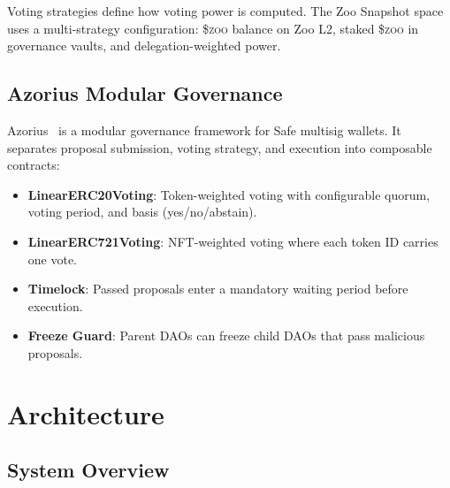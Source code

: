 \documentclass[11pt,letterpaper]{article}
\newcommand{\ZOO}{\$\textsc{zoo}}
\begin{document}
Voting strategies define how voting power is computed. The Zoo Snapshot space uses a multi-strategy configuration: \ZOO{} balance on Zoo L2, staked \ZOO{} in governance vaults, and delegation-weighted power.

\subsection{Azorius Modular Governance}

Azorius~\cite{fractal2023} is a modular governance framework for Safe multisig wallets. It separates proposal submission, voting strategy, and execution into composable contracts:

\begin{itemize}
    \item \textbf{LinearERC20Voting}: Token-weighted voting with configurable quorum, voting period, and basis (yes/no/abstain).
    \item \textbf{LinearERC721Voting}: NFT-weighted voting where each token ID carries one vote.
    \item \textbf{Timelock}: Passed proposals enter a mandatory waiting period before execution.
    \item \textbf{Freeze Guard}: Parent DAOs can freeze child DAOs that pass malicious proposals.
\end{itemize}

\section{Architecture}
\label{sec:architecture}

\subsection{System Overview}
\end{document}
